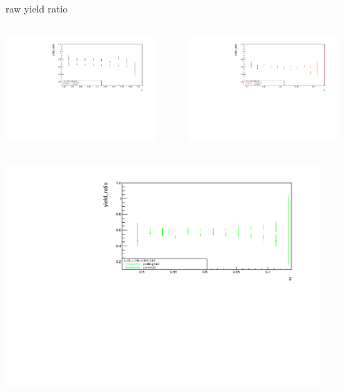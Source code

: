 \begin{frame}{raw yield ratio}
\begin{columns}
\begin{column}[T]{0.5\textwidth}
\includegraphics[width = 0.9\textwidth]{results/yield/statistics/x_Q2_z_0.65_5.500_0.40_ratio.pdf}
\end{column}
\begin{column}[T]{0.5\textwidth}
\includegraphics[width = 0.9\textwidth]{results/yield/statistics/x_Q2_z_0.65_5.500_0.50_ratio.pdf}
\end{column}
\end{columns}
\begin{columns}
\begin{column}[T]{0.5\textwidth}
\includegraphics[width = 0.9\textwidth]{results/yield/statistics/x_Q2_z_0.65_5.500_0.60_ratio.pdf}

\end{column}
\end{columns}
\end{frame}
